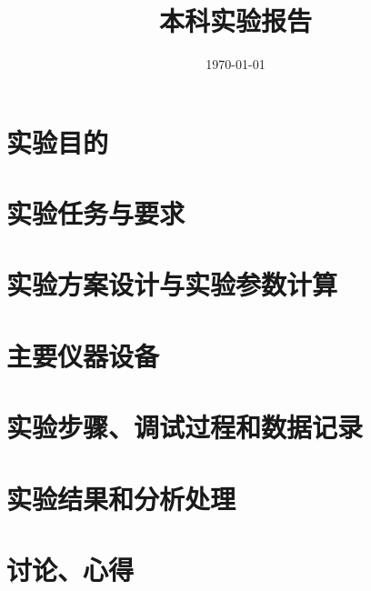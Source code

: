 \documentclass{zjureport}
\title{本科实验报告}
\date{\today}
\begin{document}
\makecover


\makeheader



\section{实验目的}


\section{实验任务与要求}


\section{实验方案设计与实验参数计算}


\section{主要仪器设备}


\section{实验步骤、调试过程和数据记录}


\section{实验结果和分析处理}


\section{讨论、心得}
\end{document}

